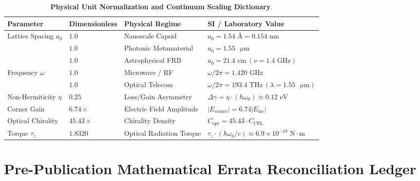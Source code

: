 \documentclass[11pt,a4paper]{article}
\theoremstyle{definition}
\begin{document}
\begin{table}[h!]
\centering
\small
\caption{\textbf{Physical Unit Normalization and Continuum Scaling Dictionary}.}
\label{tab:si_units}
\begin{tabular}{llll}
\toprule
\textbf{Parameter} & \textbf{Dimensionless} & \textbf{Physical Regime} & \textbf{SI / Laboratory Value} \\
\midrule
Lattice Spacing $a_0$ & $1.0$ & Nanoscale Capsid & $a_0 = 1.54 \text{ \AA} = 0.154 \text{ nm}$ \\
                      & $1.0$ & Photonic Metamaterial & $a_0 = 1.55 \text{ }\mu\text{m}$ \\
                      & $1.0$ & Astrophysical FRB & $a_0 = 21.4 \text{ cm} \ (\nu = 1.4 \text{ GHz})$ \\
Frequency $\omega$    & $1.0$ & Microwave / RF & $\omega / 2\pi = 1.420 \text{ GHz}$ \\
                      & $1.0$ & Optical Telecom & $\omega / 2\pi = 193.4 \text{ THz} \ (\lambda = 1.55 \text{ }\mu\text{m})$ \\
Non-Hermiticity $\eta$ & $0.25$ & Loss/Gain Asymmetry & $\Delta\gamma = \eta \cdot (\hbar\omega_0) \approx 0.12 \text{ eV}$ \\
Corner Gain           & $6.74\times$ & Electric Field Amplitude & $|E_{\mathrm{corner}}| = 6.74 |E_{\mathrm{inc}}|$ \\
Optical Chirality     & $45.43\times$ & Chirality Density & $C_{\mathrm{opt}} = 45.43 \cdot C_{\mathrm{CPL}}$ \\
Torque $\tau_z$       & $1.8320$ & Optical Radiation Torque & $\tau_z \cdot (\hbar \omega_0 / c) \approx 6.9 \times 10^{-19} \text{ N}\cdot\text{m}$ \\
\bottomrule
\end{tabular}
\end{table}

\section{Pre-Publication Mathematical Errata Reconciliation Ledger}
\end{document}
